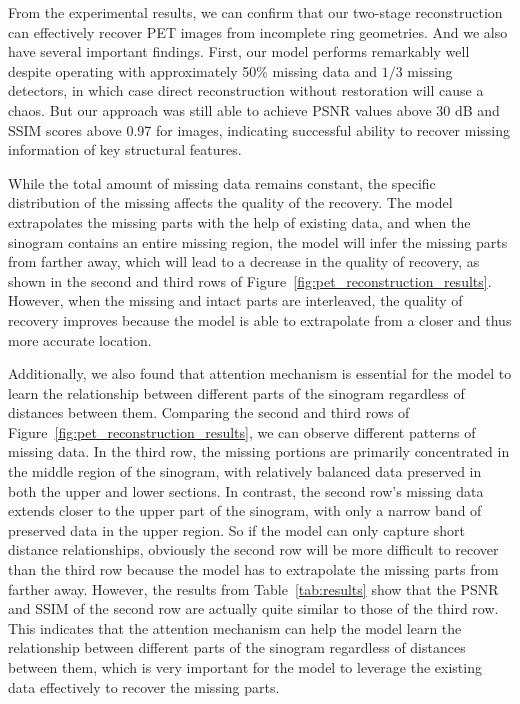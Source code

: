 \documentclass[aps,prb,preprint,groupedaddress,showkeys]{revtex4}
\begin{document}
From the experimental results, we can  confirm that our two-stage reconstruction can effectively recover  PET images from incomplete ring geometries. And we also have several important findings. 
First, our model performs remarkably well despite operating with approximately 50\% missing data and $1/3$ missing detectors, in which case direct reconstruction without restoration will cause a chaos. 
But our approach was still able to achieve PSNR values above 30 dB and SSIM scores above 0.97 for images, indicating successful ability to recover missing information of key structural features.

While the total amount of missing data remains constant, the specific distribution of the missing affects the quality of the recovery. The model extrapolates the missing parts with the help of existing data, and when the sinogram contains an entire missing region, the model will infer the missing parts from farther away, which will lead to a decrease in the quality of recovery, as shown in the second and third rows of Figure~\ref{fig:pet_reconstruction_results}. However, when the missing and intact parts are interleaved, the quality of recovery improves because the model is able to extrapolate from a closer and thus more accurate location. 

Additionally, we also found that attention mechanism is essential for the model to learn the relationship between different parts of the sinogram regardless of distances between them.
Comparing the second and third rows of Figure~\ref{fig:pet_reconstruction_results}, we can observe different patterns of missing data. In the third row, the missing portions are primarily concentrated in the middle region of the sinogram, with relatively balanced data preserved in both the upper and lower sections. In contrast, the second row's missing data extends closer to the upper part of the sinogram, with only a narrow band of preserved data in the upper region.  
So if the model can only capture short distance relationships, obviously the second row will be more difficult to recover than the third row because the model has to extrapolate the missing parts from farther away.
However, the results from Table~\ref{tab:results} show that the PSNR and SSIM of the second row are actually quite similar to those of the third row. This indicates that the attention mechanism can help the model learn the relationship between different parts of the sinogram regardless of distances between them, which is very important for the model to leverage the existing data effectively to recover the missing parts.
\end{document}
